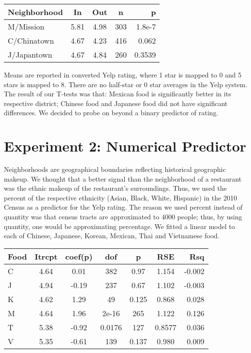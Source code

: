 \documentclass[11pt,twocolumn]{article}
\begin{document}
\begin{center}
  \begin{tabular}{| l | c | c | c | r | }
    \hline
    Neighborhood & In & Out & n & p \\ \hline
    M/Mission & 5.81 & 4.98 & 303 & 1.8e-7 \\ \hline \hline
    C/Chinatown & 4.67 & 4.23 & 416 & 0.062 \\ \hline
    J/Japantown & 4.67 & 4.84 & 260 & 0.3539 \\
    \hline
  \end{tabular}
\end{center}

Means are reported in converted Yelp rating, where 1 star is mapped to 0 and 5 stars is mapped to 8. There are no half-star or 0 star averages in the Yelp system. The result of our T-tests was that: Mexican food is significantly better in its respective district; Chinese food and Japanese food did not have significant differences. We decided to probe on beyond a binary predictor of rating.

\section{Experiment 2: Numerical Predictor}

Neighborhoods are geographical boundaries reflecting historical geographic makeup. We thought that a better signal than the neighborhood of a restaurant was the ethnic makeup of the restaurant's surroundings. Thus, we used the percent of the respective ethnicity (Asian, Black, White, Hispanic) in the 2010 Census as a predictor for the Yelp rating. The reason we used percent instead of quantity was that census tracts are approximated to 4000 people; thus, by using quantity, one would be approximating percentage. We fitted a linear model to each of Chinese, Japanese, Korean, Mexican, Thai and Vietnamese food. 

\begin{center}
  \begin{tabular}{| l | c | c | c | c | c | r | }
    \hline
    Food & Itrcpt & coef(p) & dof & p & RSE & Rsq \\ \hline \hline
    C & 4.64 & 0.01 & 382 & 0.97 & 1.154 & -0.002 \\ \hline
    J & 4.94 & -0.19 & 237 & 0.67 & 1.102 & -0.003 \\ \hline
    K & 4.62 & 1.29 & 49 & 0.125 & 0.868 & 0.028 \\ \hline
    M & 4.64 & 1.96 & 2e-16 & 265 & 1.122 & 0.126 \\ \hline
    T & 5.38 & -0.92 & 0.0176 & 127 & 0.8577 & 0.036 \\ \hline
    V & 5.35 & -0.61 & 139 & 0.137 & 0.980 & 0.009 \\
    \hline
  \end{tabular}
\end{center}
\end{document}
